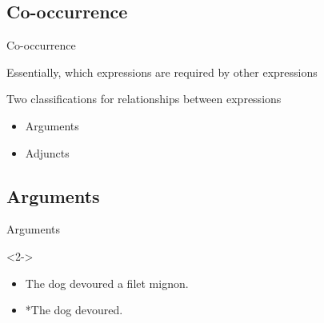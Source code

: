 \documentclass{beamer}
\newcommand{\subonethree}{Co-occurrence}
\newcommand{\subonefour}{Arguments}
\begin{document}
    \subsection{\subonethree}
      \begin{frame}{\subonethree}
        \begin{block}{}
          Essentially, which expressions are required by other expressions
        \end{block}
        \begin{block}{Two classifications for relationships between expressions}
          \begin{itemize}
            \item Arguments
            \item Adjuncts
          \end{itemize}
        \end{block}
      \end{frame}

    \subsection{\subonefour}
      \begin{frame}[t]{\subonefour}
        \begin{example}<2->
          \begin{itemize}
            \item The dog devoured a filet mignon.
            \item *The dog devoured.
          \end{itemize}
        \end{example}
      \end{frame}
\end{document}
